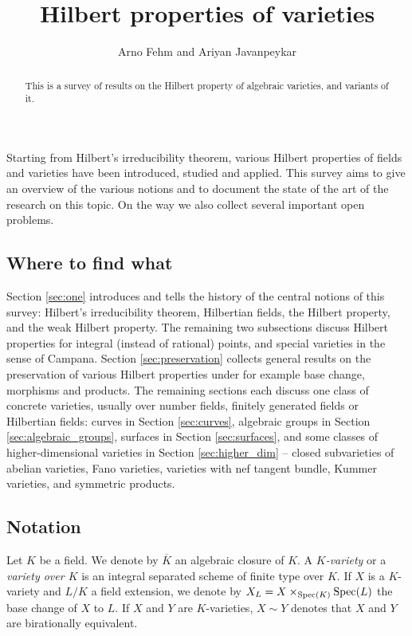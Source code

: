 \documentclass[10pt,a4paper]{amsart}
\title{Hilbert properties of varieties}
\author{Arno Fehm and Ariyan Javanpeykar}
\theoremstyle{plain}
\theoremstyle{remark}
\numberwithin{theorem}{section}
\begin{document}
\begin{abstract}
This is a survey of results on the Hilbert property of algebraic varieties, and variants of it.    
\end{abstract}

\maketitle

\noindent
Starting from Hilbert's irreducibility theorem,
various Hilbert properties of fields and varieties have been
introduced, studied and applied.
This survey aims to give an overview of the various notions
and to document the state of the art of the research on this topic.
On the way we also collect several important open problems. \smallbreak

\tableofcontents 


\subsection*{Where to find what}

Section \ref{sec:one} introduces and tells the history of the central notions of this survey:
Hilbert's irreducibility theorem, Hilbertian fields, the Hilbert property, and the weak Hilbert property.
The remaining two subsections discuss Hilbert properties for integral (instead of rational) points,
and special varieties in the sense of Campana.
Section \ref{sec:preservation} collects general results on the preservation of various Hilbert properties
under for example base change, morphisms and products.
The remaining sections each discuss one class of concrete varieties, usually over number fields, finitely generated fields or Hilbertian fields:
curves in Section \ref{sec:curves},
algebraic groups in Section \ref{sec:algebraic_groups},
surfaces in Section \ref{sec:surfaces},
and some classes of higher-dimensional varieties in Section \ref{sec:higher_dim} --
closed subvarieties of abelian varieties, Fano varieties, varieties with nef tangent bundle, Kummer varieties,
and symmetric products.

\subsection*{Notation}
Let $K$ be a field.
We denote by $\overline{K}$ an algebraic closure of $K$.
A {\em $K$-variety} or a {\em variety over $K$} is an integral separated scheme of finite type over $K$.
If $X$ is a $K$-variety and $L/K$ a field extension, we denote by $X_L=X\times_{{\rm Spec}(K)}{\rm Spec}(L)$ the base change of $X$ to $L$.
If $X$ and $Y$ are $K$-varieties, $X\sim Y$ denotes that $X$ and $Y$ are birationally equivalent.
\end{document}
